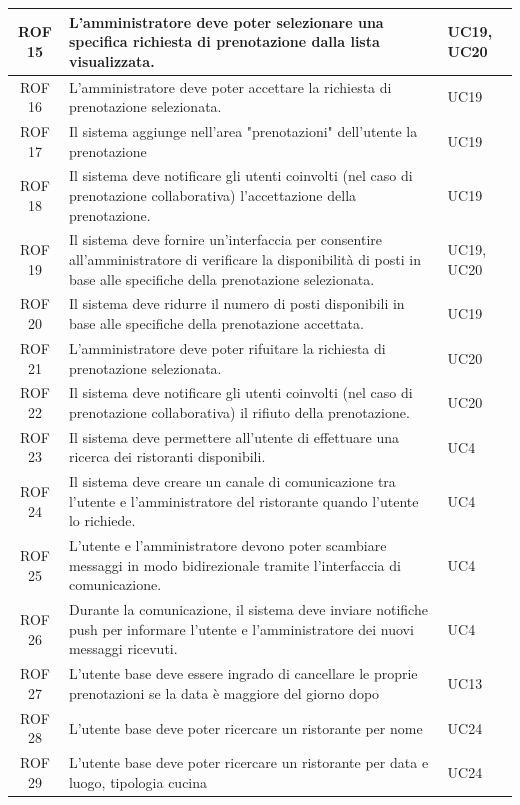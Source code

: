 \documentclass[12pt, oneside]{article}
\begin{document}
\begin{longtable}{|c|p{14cm}|p{2cm}|}
    \hline
    ROF 15 & L'amministratore deve poter selezionare una specifica richiesta di prenotazione dalla lista visualizzata. & UC19, UC20 \\
    \hline
    ROF 16 & L'amministratore deve poter accettare la richiesta di prenotazione selezionata. & UC19 \\
    \hline
    ROF 17 & Il sistema aggiunge nell'area "prenotazioni" dell'utente la prenotazione & UC19 \\
    \hline
    ROF 18 & Il sistema deve notificare gli utenti coinvolti (nel caso di prenotazione collaborativa) l'accettazione della prenotazione. & UC19 \\
    \hline
    ROF 19 & Il sistema deve fornire un'interfaccia per consentire all'amministratore di verificare la disponibilità di posti in base alle specifiche della prenotazione selezionata. & UC19, UC20 \\
    \hline
    ROF 20 & Il sistema deve ridurre il numero di posti disponibili in base alle specifiche della prenotazione accettata. & UC19 \\
    \hline
    ROF 21 & L'amministratore deve poter rifuitare la richiesta di prenotazione selezionata. & UC20 \\
    \hline
    ROF 22 & Il sistema deve notificare gli utenti coinvolti (nel caso di prenotazione collaborativa) il rifiuto della prenotazione. & UC20 \\
    \hline
    ROF 23 & Il sistema deve permettere all'utente di effettuare una ricerca dei ristoranti disponibili. & UC4 \\
    \hline
    ROF 24 & Il sistema deve creare un canale di comunicazione tra l'utente e l'amministratore del ristorante quando l'utente lo richiede. & UC4 \\
    \hline
    ROF 25 & L'utente e l'amministratore devono poter scambiare messaggi in modo bidirezionale tramite l'interfaccia di comunicazione. & UC4 \\
    \hline
    ROF 26 & Durante la comunicazione, il sistema deve inviare notifiche push per informare l'utente e l'amministratore dei nuovi messaggi ricevuti. & UC4 \\
    \hline
    ROF 27 & L'utente base deve essere ingrado di cancellare le proprie prenotazioni se la data è maggiore del giorno dopo & UC13 \\ 
    \hline
    ROF 28 & L'utente base deve poter ricercare un ristorante per nome & UC24 \\
    \hline
    ROF 29 & L'utente base deve poter ricercare un ristorante per data e luogo, tipologia cucina & UC24 \\

\end{longtable}
\end{document}
